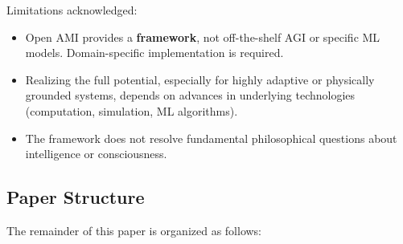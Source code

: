 \documentclass[12pt,a4paper]{report}
\begin{document}
	Limitations acknowledged:
	\begin{itemize}[leftmargin=*]
		\item Open AMI provides a \textbf{framework}, not off-the-shelf AGI or specific ML models. Domain-specific implementation is required.
		\item Realizing the full potential, especially for highly adaptive or physically grounded systems, depends on advances in underlying technologies (computation, simulation, ML algorithms).
		\item The framework does not resolve fundamental philosophical questions about intelligence or consciousness.
	\end{itemize}
	
	\subsection{Paper Structure}
	The remainder of this paper is organized as follows:
	
\end{document}
